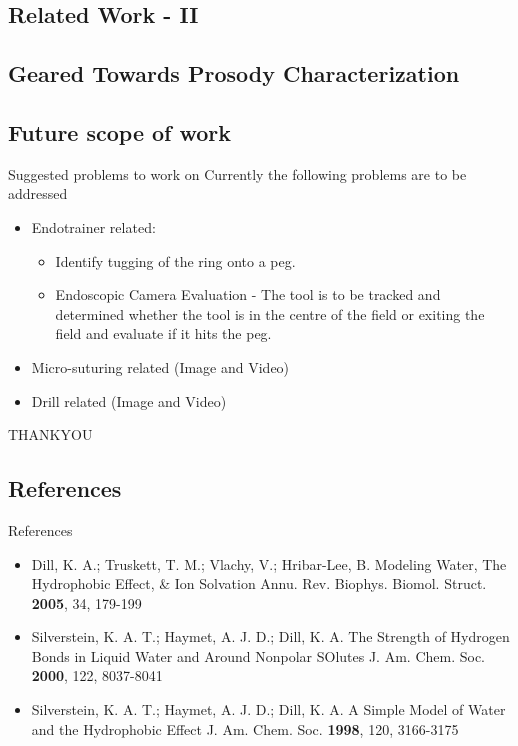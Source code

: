 \documentclass{beamer}
\begin{document}
\subsection{Related Work - II}
\subsection{Geared Towards Prosody Characterization}

\subsection{Future scope of work}

\begin{frame}{Suggested problems to work on}
\Large Currently the following problems are to be addressed
\begin{itemize}
\item Endotrainer related:
\begin{itemize}
\item \Large Identify tugging of the ring onto a peg.
\item \Large  Endoscopic Camera Evaluation - The tool is to be tracked and determined whether the tool is in the centre of the field or exiting the field and evaluate if it hits the peg.
\end{itemize}

\item Micro-suturing related (Image and Video)
\item Drill related (Image and Video)
\end{itemize}
\end{frame}
\begin{frame}
\centering \LARGE THANKYOU
\end{frame}

\subsection{References}
\begin{frame}{References}
\begin{itemize}
  \item Dill, K. A.; Truskett, T. M.; Vlachy, V.; Hribar-Lee, B. Modeling Water, The Hydrophobic Effect, \& Ion Solvation Annu. Rev. Biophys. Biomol. Struct. \textbf{2005}, 34, 179-199
  \item Silverstein, K. A. T.; Haymet, A. J. D.; Dill, K. A. The Strength of Hydrogen Bonds in Liquid Water and Around Nonpolar SOlutes J. Am. Chem. Soc. \textbf{2000}, 122, 8037-8041
  \item Silverstein, K. A. T.; Haymet, A. J. D.; Dill, K. A. A Simple Model of Water and the Hydrophobic Effect J. Am. Chem. Soc. \textbf{1998}, 120, 3166-3175
\end{itemize}
\end{frame}
\end{document}
